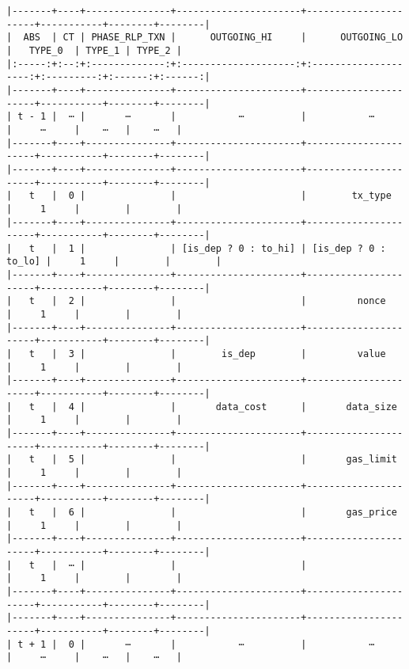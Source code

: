 \documentclass[varwidth=\maxdimen,margin=0.5cm,multi={verbatim}]{standalone}
\begin{document}
\begin{verbatim}
|-------+----+---------------+----------------------+----------------------+-----------+--------+--------|
|  ABS  | CT | PHASE_RLP_TXN |      OUTGOING_HI     |      OUTGOING_LO     |   TYPE_0  | TYPE_1 | TYPE_2 |
|:-----:+:--:+:-------------:+:--------------------:+:--------------------:+:---------:+:------:+:------:|
|-------+----+---------------+----------------------+----------------------+-----------+--------+--------|
| t - 1 |  ⋯ |       ⋯       |           ⋯          |           ⋯          |     ⋯     |    ⋯   |    ⋯   |
|-------+----+---------------+----------------------+----------------------+-----------+--------+--------|
|-------+----+---------------+----------------------+----------------------+-----------+--------+--------|
|   t   |  0 |               |                      |        tx_type       |     1     |        |        |
|-------+----+---------------+----------------------+----------------------+-----------+--------+--------|
|   t   |  1 |               | [is_dep ? 0 : to_hi] | [is_dep ? 0 : to_lo] |     1     |        |        |
|-------+----+---------------+----------------------+----------------------+-----------+--------+--------|
|   t   |  2 |               |                      |         nonce        |     1     |        |        |
|-------+----+---------------+----------------------+----------------------+-----------+--------+--------|
|   t   |  3 |               |        is_dep        |         value        |     1     |        |        |
|-------+----+---------------+----------------------+----------------------+-----------+--------+--------|
|   t   |  4 |               |       data_cost      |       data_size      |     1     |        |        |
|-------+----+---------------+----------------------+----------------------+-----------+--------+--------|
|   t   |  5 |               |                      |       gas_limit      |     1     |        |        |
|-------+----+---------------+----------------------+----------------------+-----------+--------+--------|
|   t   |  6 |               |                      |       gas_price      |     1     |        |        |
|-------+----+---------------+----------------------+----------------------+-----------+--------+--------|
|   t   |  ⋯ |               |                      |                      |     1     |        |        |
|-------+----+---------------+----------------------+----------------------+-----------+--------+--------|
|-------+----+---------------+----------------------+----------------------+-----------+--------+--------|
| t + 1 |  0 |       ⋯       |           ⋯          |           ⋯          |     ⋯     |    ⋯   |    ⋯   |




\end{verbatim}
\end{document}
